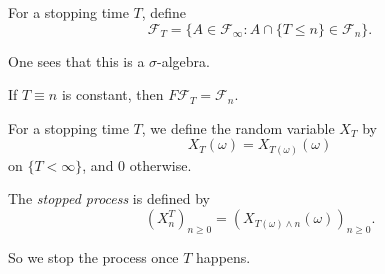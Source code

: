 \documentclass[a4paper]{article}
\begin{document}
\begin{defi}[$\mathcal{F}_T$]
  For a stopping time $T$, define
  \[
    \mathcal{F}_T = \{A \in \mathcal{F}_\infty : A \cap \{T \leq n\} \in \mathcal{F}_n\}.
  \]
\end{defi}
One sees that this is a $\sigma$-algebra.

\begin{eg}
  If $T \equiv n$ is constant, then $F\mathcal{F}_T = \mathcal{F}_n$.
\end{eg}

\begin{defi}[$X_T$]
  For a stopping time $T$, we define the random variable $X_T$ by
  \[
    X_T (\omega) = X_{T(\omega)}(\omega)
  \]
  on $\{T < \infty\}$, and $0$ otherwise.
\end{defi}

\begin{defi}
  The \emph{stopped process} is defined by
  \[
    (X_n^T)_{n \geq 0} = (X_{T(\omega) \wedge n}(\omega))_{n \geq 0}.
  \]
\end{defi}
So we stop the process once $T$ happens.
\printindex
\end{document}
